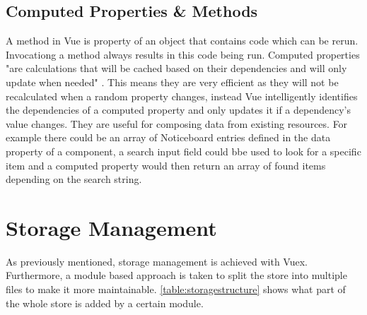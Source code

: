 \subsection{Computed Properties \& Methods}
A method in Vue is property of an object that contains code which can be rerun. Invocationg a method always results in this code being run. Computed properties "are calculations that will be cached based on their dependencies and will only update when needed" \cite{filipova2016learning}. This means they are very efficient as they will not be recalculated when a random property changes, instead Vue intelligently identifies the dependencies of a computed property and only updates it if a dependency's value changes. They are useful for composing data from existing resources. For example there could be an array of Noticeboard entries defined in the data property of a component, a search input field could bbe used to look for a specific item and a computed property would then return an array of found items depending on the search string.

\section{Storage Management}
As previously mentioned, storage management is achieved with Vuex. Furthermore, a module based approach is taken to split the store into multiple files to make it more maintainable. \autoref{table:storagestructure} shows what part of the whole store is added by a certain module.

